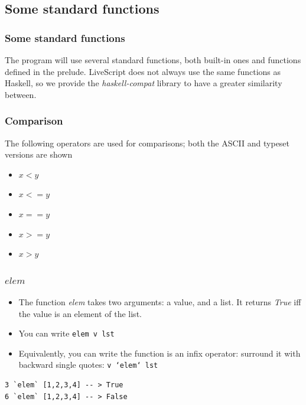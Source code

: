 \documentclass{beamer}
\begin{document}
\subsection{Some standard functions}
\begin{frame}[fragile]
\frametitle{Some standard functions}

The program will use several standard functions, both built-in ones and functions defined in the prelude. LiveScript does not always use the same functions as Haskell, so we provide the \emph{haskell-compat} library to have a greater similarity between.

\end{frame}

\begin{frame}[fragile]
\frametitle{Comparison}

The following operators are used for comparisons; both the ASCII
and typeset versions are shown

\begin{itemize}
\item $x < y$   
\item $x <= y $
\item $x == y $
\item $x >= y $
\item $x > y$   
\end{itemize}

\end{frame}

\begin{frame}[fragile]
\frametitle{$elem$}

\begin{itemize}
\item The function \emph{elem} takes two arguments: a value, and a
  list.  It returns \emph{True} iff the value is an element of the list.
\item You can write \texttt{elem v lst}
\item Equivalently, you can write the function is an infix
  operator: surround it with backward single quotes: \texttt{v `elem` lst}
\end{itemize}

\begin{verbatim}
3 `elem` [1,2,3,4] -- > True
6 `elem` [1,2,3,4] -- > False
\end{verbatim}

\end{frame}
\end{document}

